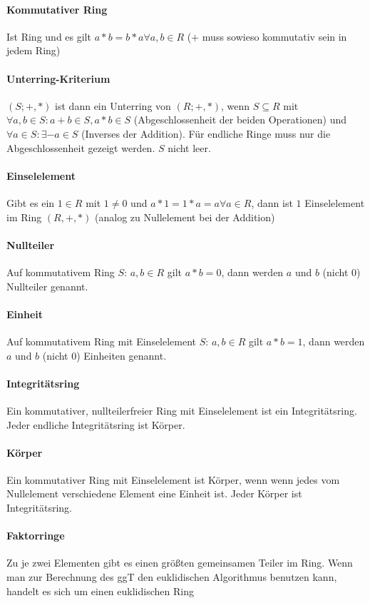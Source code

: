 \documentclass[12pt,landscape]{article}
\begin{document}
\begin{multicols}{3}
\paragraph{Kommutativer Ring} Ist Ring und es gilt $a * b = b * a \forall a, b \in R$ ($+$ muss sowieso kommutativ sein in jedem Ring)
\paragraph{Unterring-Kriterium} $(S; +, *)$ ist dann ein Unterring von $(R; +, *)$, wenn $S \subseteq R$ mit $\forall a, b \in S: a + b \in S, a * b \in S$ (Abgeschlossenheit der beiden Operationen) und $\forall a \in S: \exists -a \in S$ (Inverses der Addition). Für endliche Ringe muss nur die Abgeschlossenheit gezeigt werden.  $S$ nicht leer.
\paragraph{Einselelement} Gibt es ein $1 \in R$ mit $1 \neq 0$ und $a * 1 = 1 * a = a \forall a \in R$, dann ist $1$ Einselelement im Ring $(R, +, *)$ (analog zu Nullelement bei der Addition)
\paragraph{Nullteiler} Auf kommutativem Ring  $S$: $a, b \in R$ gilt $a * b = 0$, dann werden $a$ und $b$ (nicht $0$) Nullteiler genannt.
\paragraph{Einheit} Auf kommutativem Ring mit Einselelement $S$: $a, b \in R$ gilt $a * b = 1$, dann werden $a$ und $b$ (nicht $0$) Einheiten genannt.
\paragraph{Integritätsring} Ein kommutativer, nullteilerfreier Ring mit Einselelement ist ein Integritätsring. Jeder endliche Integritätsring ist Körper.
\paragraph{Körper} Ein kommutativer Ring mit Einselelement ist Körper, wenn wenn jedes vom Nullelement verschiedene Element eine Einheit ist. Jeder Körper ist Integritätsring.
\paragraph{Faktorringe} Zu je zwei Elementen gibt es einen größten gemeinsamen Teiler im Ring. Wenn man zur Berechnung des ggT den euklidischen Algorithmus benutzen kann, handelt es sich um einen euklidischen Ring

\end{multicols}
\end{document}
